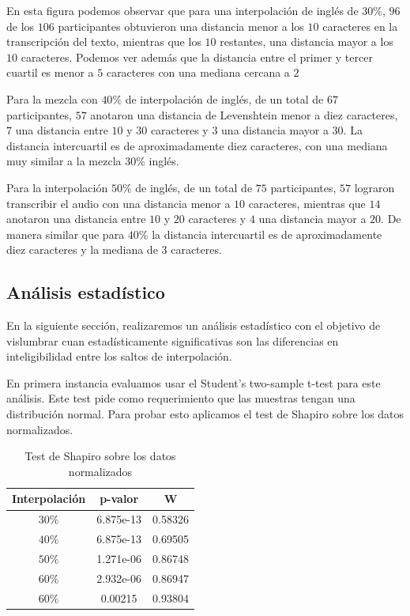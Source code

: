 En esta figura podemos observar que para una interpolación de inglés de $30\%$, $96$ de los $106$ participantes obtuvieron una distancia menor a los $10$ caracteres en la transcripción del texto, mientras que los $10$ restantes, una distancia mayor a los $10$ caracteres. Podemos ver además que la distancia entre el primer y tercer cuartil es menor a $5$ caracteres con una mediana cercana a $2$ 

Para la mezcla con $40\%$ de interpolación de inglés, de un total de $67$ participantes, $57$ anotaron una distancia de Levenshtein menor a diez caracteres, $7$ una distancia entre $10$ y $30$ caracteres y $3$ una distancia mayor a $30$. La distancia intercuartil es de aproximadamente diez caracteres, con una mediana muy similar a la mezcla $30\%$ inglés.

Para la interpolación $50\%$ de inglés, de un total de $75$ participantes, $57$ lograron transcribir el audio con una distancia menor a $10$ caracteres, mientras que $14$ anotaron una distancia entre $10$ y $20$ caracteres y $4$ una distancia mayor a $20$. De manera similar que para $40\%$ la distancia intercuartil es de aproximadamente diez caracteres y la mediana de $3$ caracteres.

\subsection{Análisis estadístico}

En la siguiente sección, realizaremos un análisis estadístico con el objetivo de vislumbrar cuan estadísticamente significativas son las diferencias en inteligibilidad entre los saltos de interpolación.

En primera instancia evaluamos usar el Student's two-sample t-test para este análisis. Este test pide como requerimiento que las muestras tengan una distribución normal. Para probar esto aplicamos el test de Shapiro sobre los datos normalizados.

\begin{table}
\centering
\begin{tabular}[t]{| c | c | c |}
\hline
Interpolación & p-valor & W \\
\hline
\hline
$30\%$ & 6.875e-13 & 0.58326 \\
\hline
$40\%$ & 6.875e-13 & 0.69505 \\
\hline
$50\%$ & 1.271e-06 & 0.86748 \\
\hline
$60\%$ & 2.932e-06 & 0.86947 \\
\hline
$60\%$ & 0.00215 & 0.93804\\

\hline
\end{tabular}
\caption{Test de Shapiro sobre los datos normalizados} 
\label{fig:resultadosShapiro}
\end{table}

